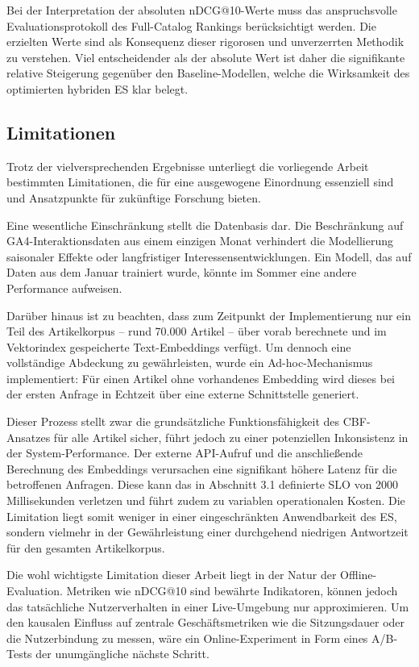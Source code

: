 Bei der Interpretation der absoluten \ac{nDCG}@10-Werte muss das anspruchsvolle Evaluationsprotokoll des 
Full-Catalog Rankings berücksichtigt werden. Die erzielten Werte sind als Konsequenz dieser rigorosen und 
unverzerrten Methodik zu verstehen. Viel entscheidender als der absolute Wert ist daher die signifikante relative 
Steigerung gegenüber den Baseline-Modellen, welche die Wirksamkeit des optimierten hybriden \ac{ES} klar belegt.

\subsection{Limitationen}
Trotz der vielversprechenden Ergebnisse unterliegt die vorliegende Arbeit bestimmten Limitationen, 
die für eine ausgewogene Einordnung essenziell sind und Ansatzpunkte für zukünftige Forschung bieten.

Eine wesentliche Einschränkung stellt die Datenbasis dar. Die Beschränkung auf 
\ac{GA4}-Interaktionsdaten aus einem einzigen Monat verhindert die Modellierung saisonaler Effekte 
oder langfristiger Interessensentwicklungen. Ein Modell, das auf Daten aus dem Januar trainiert wurde, 
könnte im Sommer eine andere Performance aufweisen.

Darüber hinaus ist zu beachten, dass zum Zeitpunkt der Implementierung nur ein Teil des 
Artikelkorpus – rund 70.000 Artikel – über vorab berechnete und im Vektorindex gespeicherte 
Text-Embeddings verfügt. Um dennoch eine vollständige Abdeckung zu gewährleisten, 
wurde ein Ad-hoc-Mechanismus implementiert: Für einen Artikel ohne vorhandenes Embedding wird 
dieses bei der ersten Anfrage in Echtzeit über eine externe Schnittstelle generiert.

Dieser Prozess stellt zwar die grundsätzliche Funktionsfähigkeit des \ac{CBF}-Ansatzes 
für alle Artikel sicher, führt jedoch zu einer potenziellen Inkonsistenz in der System-Performance. 
Der externe API-Aufruf und die anschließende Berechnung des Embeddings verursachen eine signifikant 
höhere Latenz für die betroffenen Anfragen. Diese kann das in Abschnitt 3.1 definierte \ac{SLO} 
von 2000 Millisekunden verletzen und führt zudem zu variablen operationalen Kosten. 
Die Limitation liegt somit weniger in einer eingeschränkten Anwendbarkeit des \ac{ES}, 
sondern vielmehr in der Gewährleistung einer durchgehend niedrigen Antwortzeit für den gesamten 
Artikelkorpus.

Die wohl wichtigste Limitation dieser Arbeit liegt in der Natur der Offline-Evaluation. Metriken wie 
\ac{nDCG}@10 sind bewährte Indikatoren, können jedoch das tatsächliche Nutzerverhalten in einer Live-Umgebung 
nur approximieren. Um den kausalen Einfluss auf zentrale Geschäftsmetriken wie die Sitzungsdauer oder die 
Nutzerbindung zu messen, wäre ein Online-Experiment in Form eines A/B-Tests der unumgängliche nächste Schritt.

